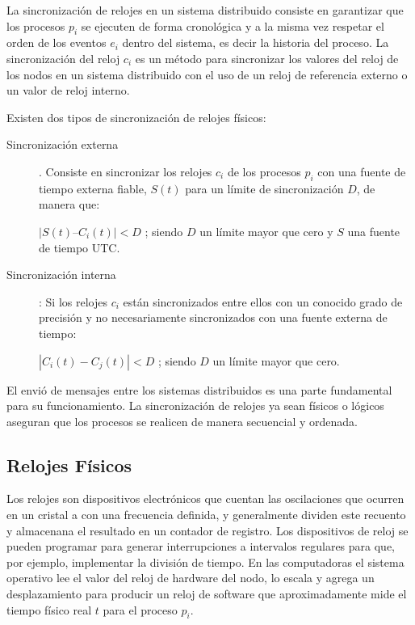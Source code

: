  
    
 La sincronización de relojes 	    en un sistema distribuido consiste en garantizar que los procesos  $p_{i}$ se ejecuten de forma cronológica y a la misma vez respetar el orden de los eventos $e_{i}$ dentro del sistema, es decir la historia del proceso.  La sincronización del reloj  $c_{i}$ es un método para sincronizar los valores del reloj de los nodos en un sistema distribuido con el uso de un reloj de referencia externo o un valor de reloj interno. 
	 
	Existen dos tipos de sincronización de relojes físicos:
	
	\begin{description}
		\item  [Sincronización externa]. Consiste en sincronizar los relojes  $c_{i}$ de los procesos  $p_{i}$ con una fuente de tiempo externa fiable, $S(t)$ para un  límite de sincronización $D$, de manera que:
		
	  $	|S(t) – C_{i}(t)| < D $ ; siendo $D$ un límite mayor que cero y $S$ una fuente de tiempo UTC.
		
		\item  [Sincronización interna]: Si los relojes  $c_{i}$ están sincronizados entre ellos con un conocido grado de precisión y no necesariamente sincronizados con una fuente externa de tiempo:
		
		$|C_{i}(t) -C_{j}(t) | < D $ ; siendo $D$ un límite mayor que cero.
	\end{description}
	 
	 
	 El envió de mensajes entre los sistemas distribuidos es una parte fundamental para su funcionamiento. La sincronización de relojes ya sean físicos o lógicos aseguran que los procesos se realicen de manera secuencial y ordenada. 
	
\subsection{Relojes F\'isicos }	
 
	 	
	
	  Los \gls{relojes} son dispositivos electrónicos que cuentan las oscilaciones que ocurren en un cristal a con una frecuencia definida, y generalmente dividen este recuento y almacenana el resultado en un contador de registro. 
	 Los dispositivos de reloj se pueden programar para generar interrupciones a intervalos regulares  para que, por ejemplo, implementar la división de tiempo.
	  En las computadoras   el sistema operativo lee el valor del reloj de hardware del nodo, lo escala y agrega un desplazamiento para producir un reloj de software  que aproximadamente mide el tiempo físico real $t$ para el proceso $p_{i}$. 
	

